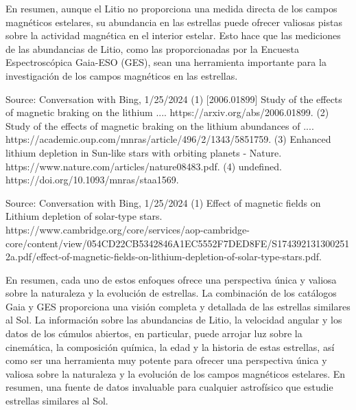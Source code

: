 En resumen, aunque el Litio no proporciona una medida directa de los campos magnéticos estelares, su abundancia en las estrellas puede ofrecer valiosas pistas sobre la actividad magnética en el interior estelar. Esto hace que las mediciones de las abundancias de Litio, como las proporcionadas por la Encuesta Espectroscópica Gaia-ESO (GES), sean una herramienta importante para la investigación de los campos magnéticos en las estrellas.

Source: Conversation with Bing, 1/25/2024
(1) [2006.01899] Study of the effects of magnetic braking on the lithium .... https://arxiv.org/abs/2006.01899.
(2) Study of the effects of magnetic braking on the lithium abundances of .... https://academic.oup.com/mnras/article/496/2/1343/5851759.
(3) Enhanced lithium depletion in Sun-like stars with orbiting planets - Nature. https://www.nature.com/articles/nature08483.pdf.
(4) undefined. https://doi.org/10.1093/mnras/staa1569.

Source: Conversation with Bing, 1/25/2024
(1) Effect of magnetic fields on Lithium depletion of solar-type stars. https://www.cambridge.org/core/services/aop-cambridge-core/content/view/054CD22CB5342846A1EC5552F7DED8FE/S1743921313002512a.pdf/effect-of-magnetic-fields-on-lithium-depletion-of-solar-type-stars.pdf.




En resumen, cada uno de estos enfoques ofrece una perspectiva única y valiosa sobre la naturaleza y la evolución de estrellas. La combinación de los catálogos Gaia y GES proporciona una visión completa y detallada de las estrellas similares al Sol. La información sobre las abundancias de Litio, la velocidad angular y los datos de los cúmulos abiertos, en particular, puede arrojar luz sobre la cinemática, la composición química, la edad y la historia de estas estrellas, así como ser una herramienta muy potente para ofrecer una perspectiva única y valiosa sobre la naturaleza y la evolución de los campos magnéticos estelares.  En resumen, una fuente de datos invaluable para cualquier astrofísico que estudie estrellas similares al Sol.\par





